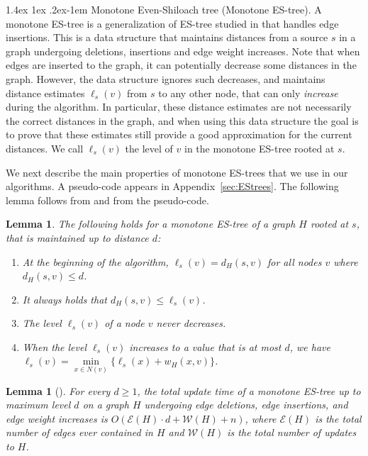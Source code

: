 \documentclass[11pt]{article}
\makeatletter
\newtheorem{lemma}[theorem]{Lemma}
\theoremstyle{definition}
\theoremstyle{remark}
\renewcommand{\paragraph}{%
  \@startsection{paragraph}{4}%
  {\z@}{1.4ex \@plus 1ex \@minus .2ex}{-1em}%
  {\normalfont\normalsize\bfseries}%
}
\makeatother
\begin{document}
\begin{titlepage}
\paragraph{Monotone Even-Shiloach tree (Monotone ES-tree).}
A monotone ES-tree is a generalization of ES-tree studied in \cite{HKN2016,henzinger2014decremental} that handles edge insertions. This is a data structure that maintains distances from a source $s$ in a graph undergoing deletions, insertions and edge weight increases. Note that when edges are inserted to the graph, it can potentially decrease some distances in the graph. However, the data structure ignores such decreases, and maintains distance estimates $\ell_s(v)$ from $s$ to any other node, that can only \emph{increase} during the algorithm. In particular, these distance estimates are not necessarily the correct distances in the graph, and when using this data structure the goal is to prove that these estimates still provide a good approximation for the current distances. We call $\ell_s(v)$ the level of $v$ in the monotone ES-tree rooted at $s$.

We next describe the main properties of monotone ES-trees that we use in our algorithms. A pseudo-code appears in Appendix~\ref{sec:EStrees}. The following lemma follows from \cite{HKN2016} and from the pseudo-code.

\begin{lemma}\label{obs:simple_observations_monotone_ES}
The following holds for a monotone ES-tree of a graph $H$ rooted at $s$, that is maintained up to distance $d$:
\begin{enumerate}[label=(\arabic{*})]
\item At the beginning of the algorithm, $\ell_s(v)=d_H(s,v)$ for all nodes $v$ where $d_H(s,v) \leq d$.\label{obs:beginning}
\item It always holds that $d_H(s,v) \leq \ell_s(v)$.\label{item:easy_side}
\item \label{item: observation one} The level $\ell_s(v)$ of a node $v$ never decreases.
\item When the level $\ell_s(v)$ increases to a value that is at most $d$, we have $\ell_s(v) = \min\limits_{x\in N(v)} \{\ell_s(x)+w_{H}(x,v) \}$.\label{item:change}
\end{enumerate}
\end{lemma}


\begin{lemma}[\cite{HKN2016}]\label{lm:ES-tree}
    For every $d \geq 1$, the total update time of a monotone ES-tree up to maximum level $d$ on a graph $H$ undergoing edge deletions, edge insertions, and edge weight increases is $O(\mathcal E(H)\cdot d+\mathcal W(H)+n)$, where $\mathcal E(H)$ is the total number of edges ever contained in $H$ and $\mathcal W(H)$ is the total number of updates to $H$.
\end{lemma}




\end{titlepage}
\end{document}
